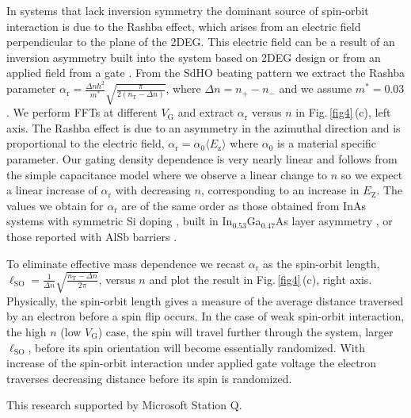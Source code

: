 \documentclass[
floatfix,
aps,
prl,
twocolumn,
superscriptaddress,
amssymb,
 groupaddress,
]{revtex4}
\def\nn{\nonumber}
\def\nt{\nu_{\mathrm{T}}}
\def\nt{n_{\mathrm{T}}}
\def\ar{\alpha_{\mathrm{r}}}
\def\np{n_{+}}
\def\nn{n_{-}}
\def\nt{n_{\mathrm{T}}}
\def\lso{\ell_{\mathrm{SO}}}
\begin{document}
In systems that lack inversion symmetry the dominant source of spin-orbit interaction is due to the Rashba effect, which arises from an electric field perpendicular to the plane of the 2DEG.
This electric field can be a result of an inversion asymmetry built into the system based on 2DEG design or from an applied field from a gate \citep{nitta:1997}.
From the SdHO beating pattern we extract the Rashba parameter $\ar=\frac{\Delta n\hbar^{2}}{m^{*}}\sqrt{\frac{\pi}{2(\nt-\Delta n)}}$, where $\Delta n = \np-\nn$ and we assume $m^{*}=0.03$ \citep{shabani:2014_MIT}.
We perform FFTs at different $V_{\mathrm{G}}$ and extract $\ar$ versus $n$ in Fig.\,\ref{fig4}\,(c), left axis.
The Rashba effect is due to an asymmetry in the azimuthal direction and is proportional to the electric field, $\ar = \alpha_{\mathrm{0}}\langle E_{\mathrm{z}}\rangle$ where $\alpha_{\mathrm{0}}$ is a material specific parameter.
Our gating density dependence is very nearly linear and follows from the simple capacitance model where we observe a linear change to $n$ so we expect a linear increase of $\ar$ with decreasing $n$, corresponding to an increase in $E_{\mathrm{Z}}$.
The values we obtain for $\ar$ are of the same order as those obtained from InAs systems with symmetric Si doping \citep{kim:2010}, built in In$_{0.53}$Ga$_{0.47}$As layer asymmetry \citep{lee:2011,park:2013}, or those reported with AlSb barriers \citep{shojaei:2016}.


To eliminate effective mass dependence we recast $\ar$ as the spin-orbit length, $\lso=\frac{1}{\Delta n}\sqrt{\frac{\nt-\Delta n}{2\pi}}$, versus $n$ and plot the result in Fig.\,\ref{fig4}\,(c), right axis.
Physically, the spin-orbit length gives a measure of the average distance traversed by an electron before a spin flip occurs.
In the case of weak spin-orbit interaction, the high $n$ (low $V_{\mathrm{G}}$) case, the spin will travel further through the system, larger $\lso$, before its spin orientation will become essentially randomized.
With increase of the spin-orbit interaction under applied gate voltage the electron traverses decreasing distance before its spin is randomized.



This research supported by Microsoft Station Q.




%
\end{document}
